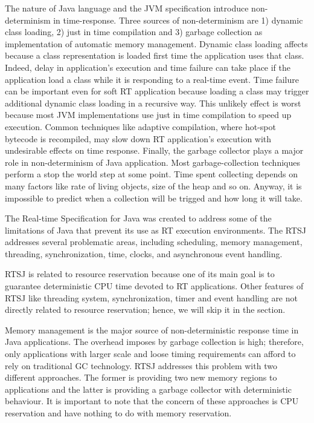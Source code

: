 The nature of Java language and the JVM specification introduce non-determinism in time-response.
Three sources of non-determinism are 1) dynamic class loading, 2) just in time compilation and 3) garbage collection as implementation of automatic memory management.
Dynamic class loading affects because a class representation is loaded first time the application uses that class.
Indeed, delay in application's execution and time failure can take place if the application load a class while it is responding to a real-time event.
Time failure can be important even for soft RT application because loading a class may trigger additional dynamic class loading in a recursive way.
This unlikely effect is worst because most JVM implementations use just in time compilation to speed up execution.
Common techniques like adaptive compilation, where hot-spot bytecode is recompiled, may slow down RT application's execution with undesirable effects on time response.
Finally, the garbage collector plays a major role in non-determinism of Java application.
Most garbage-collection techniques perform a stop the world step at some point.
Time spent collecting depends on many factors like rate of living objects, size of the heap and so on. Anyway, it is impossible to predict when a collection will be trigged and how long it will take.

The Real-time Specification for Java was created to address some of the limitations of Java that prevent its use as RT execution environments. The RTSJ addresses several problematic areas, including scheduling, memory management, threading, synchronization, time, clocks, and asynchronous event handling.

RTSJ is related to resource reservation because one of its main goal is to guarantee deterministic CPU time devoted to RT applications. Other features of RTSJ like threading system, synchronization, timer and event handling are not directly related to resource reservation; hence, we will skip it in the section.

Memory management is the major source of non-deterministic response time in Java applications. The overhead imposes by garbage collection is high; therefore, only applications with larger scale and loose timing requirements can afford to rely on traditional GC technology.
RTSJ addresses this problem with two different approaches.
The former is providing two new memory regions to applications and the latter is providing a garbage collector with deterministic behaviour.
It is important to note that the concern of these approaches is CPU reservation and have nothing to do with memory reservation.

